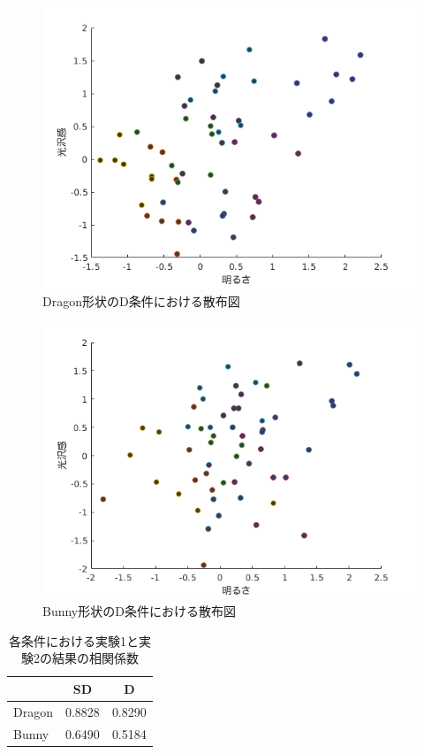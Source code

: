            \begin{figure}[h]
                \centering
                \includegraphics[width=12.0cm]{./img/ex3_DD.png}
                \caption{Dragon形状のD条件における散布図}
                \label{ex3_DD}
            \end{figure}

            \begin{figure}[h]
                \centering
                \includegraphics[width=12.0cm]{./img/ex3_BD.png}
                \caption{Bunny形状のD条件における散布図}
                \label{ex3_BD}
            \end{figure}

            \begin{table}[h]
                \centering
                \caption{各条件における実験1と実験2の結果の相関係数}
                \begin{tabular}{|l||c|c|} \hline
                                & SD       & D        \\ \hline \hline
                    Dragon      & 0.8828   & 0.8290   \\ \hline
                    Bunny       & 0.6490   & 0.5184   \\ \hline
                \end{tabular}
                \label{cc}
            \end{table}

